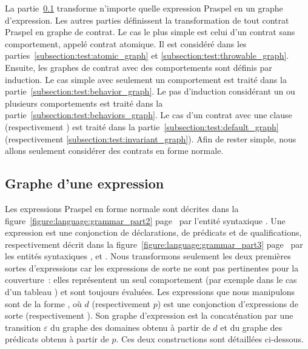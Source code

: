 La partie~\ref{subsection:test:expression_graph} transforme n'importe quelle
expression Praspel en un graphe d'expression. Les autres parties définissent la
transformation de tout contrat Praspel en graphe de contrat. Le cas le plus
simple est celui d'un contrat sans comportement, appelé {\strong contrat
atomique}. Il est considéré dans les parties~\ref{subsection:test:atomic_graph}
et \ref{subsection:test:throwable_graph}. Ensuite, les graphes de contrat avec
des comportements sont définis par induction. Le cas simple avec seulement un
comportement est traité dans la partie~\ref{subsection:test:behavior_graph}. Le
pas d'induction considérant un ou plusieurs comportements est traité dans la
partie~\ref{subsection:test:behaviors_graph}. Le cas d'un contrat avec une
clause \adefault (respectivement \ainvariant) est traité dans la
partie~\ref{subsection:test:default_graph} (respectivement
\ref{subsection:test:invariant_graph}). Afin de rester simple, nous allons
seulement considérer des contrats en forme normale.

\subsection{Graphe d'une expression}
\label{subsection:test:expression_graph}

Les expressions Praspel en forme normale sont décrites dans la
figure~\ref{figure:language:grammar_part2}
page~\pageref{figure:language:grammar_part2} par l'entité syntaxique
. Une expression est une conjonction de déclarations, de
prédicats et de qualifications, respectivement décrit dans la
figure~\ref{figure:language:grammar_part3}
page~\pageref{figure:language:grammar_part3} par les entités syntaxiques
,  et . Nous transformons
seulement les deux premières sortes d'expressions car les expressions de sorte
 ne sont pas pertinentes pour la couverture~: elles
représentent un seul comportement (par exemple  dans le cas
d'un tableau ) et sont toujours évaluées.
Les expressions que nous manipulons sont de la forme , où $d$ (respectivement $p$) est une conjonction d'expressions de sorte
 (respectivement ). Son graphe d'expression
est la concaténation par une transition $\varepsilon$ du {\strong graphe des
domaines} obtenu à partir de $d$ et du {\strong graphe des prédicats} obtenu à
partir de $p$. Ces deux constructions sont détaillées ci-dessous.

